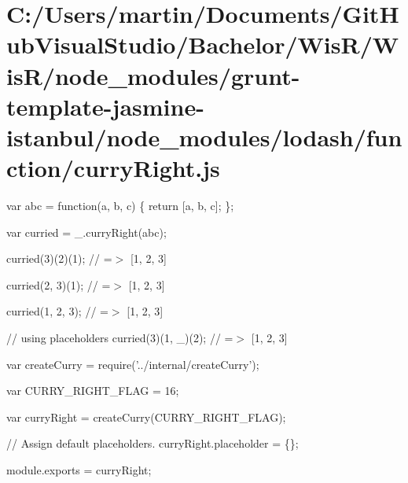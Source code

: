 \hypertarget{_c_1_2_users_2martin_2_documents_2_git_hub_visual_studio_2_bachelor_2_wis_r_2_wis_r_2node_module0e1359e813649b547d561298c94333f1}{}\section{C\+:/\+Users/martin/\+Documents/\+Git\+Hub\+Visual\+Studio/\+Bachelor/\+Wis\+R/\+Wis\+R/node\+\_\+modules/grunt-\/template-\/jasmine-\/istanbul/node\+\_\+modules/lodash/function/curry\+Right.\+js}
var abc = function(a, b, c) \{ return \mbox{[}a, b, c\mbox{]}; \};

var curried = \+\_\+.\+curry\+Right(abc);

curried(3)(2)(1); // =$>$ \mbox{[}1, 2, 3\mbox{]}

curried(2, 3)(1); // =$>$ \mbox{[}1, 2, 3\mbox{]}

curried(1, 2, 3); // =$>$ \mbox{[}1, 2, 3\mbox{]}

// using placeholders curried(3)(1, \+\_\+)(2); // =$>$ \mbox{[}1, 2, 3\mbox{]}


\begin{DoxyCodeInclude}
var createCurry = require(\textcolor{stringliteral}{'../internal/createCurry'});

var CURRY\_RIGHT\_FLAG = 16;

var curryRight = createCurry(CURRY\_RIGHT\_FLAG);

\textcolor{comment}{// Assign default placeholders.}
curryRight.placeholder = \{\};

module.exports = curryRight;
\end{DoxyCodeInclude}
 